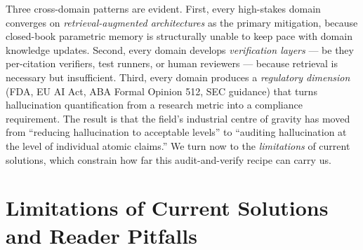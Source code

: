 \documentclass{article}
\begin{document}
Three cross-domain patterns are evident. First, every high-stakes domain converges on \emph{retrieval-augmented architectures} as the primary mitigation, because closed-book parametric memory is structurally unable to keep pace with domain knowledge updates. Second, every domain develops \emph{verification layers} --- be they per-citation verifiers, test runners, or human reviewers --- because retrieval is necessary but insufficient. Third, every domain produces a \emph{regulatory dimension} (FDA, EU AI Act, ABA Formal Opinion 512, SEC guidance) that turns hallucination quantification from a research metric into a compliance requirement. The result is that the field's industrial centre of gravity has moved from ``reducing hallucination to acceptable levels'' to ``auditing hallucination at the level of individual atomic claims.'' We turn now to the \emph{limitations} of current solutions, which constrain how far this audit-and-verify recipe can carry us.

\section{Limitations of Current Solutions and Reader Pitfalls}\label{limitations-of-current-solutions-and-reader-pitfalls}
\end{document}
